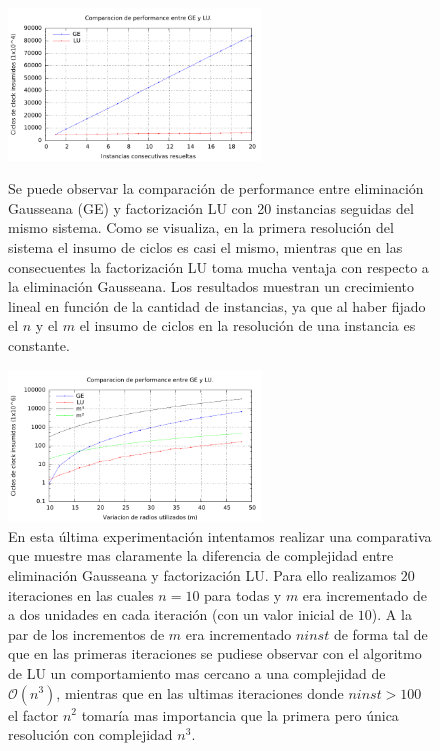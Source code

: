 \clearpage

\begin{figure}
  \caption{ Se puede observar la comparaci\'on de performance entre eliminaci\'on Gausseana (GE) y factorizaci\'on LU con 20 instancias seguidas del mismo sistema. Como se visualiza, en la primera resoluci\'on del sistema el insumo de ciclos es casi el mismo, mientras que en las consecuentes la factorizaci\'on LU toma mucha ventaja con respecto a la eliminaci\'on Gausseana. Los resultados muestran un crecimiento lineal en funci\'on de la cantidad de instancias, ya que al haber fijado  el $n$ y el $m$ el insumo de ciclos en la resoluci\'on de una instancia es constante.\newline}
  \includegraphics[width=0.6\textwidth]{../src/experimentacion/PDFs/compbench.pdf}
  \label{compbench-glu}
\end{figure}

\begin{figure}
\caption{ En esta última experimentaci\'on intentamos realizar una comparativa que muestre mas claramente la diferencia de complejidad entre eliminaci\'on Gausseana y factorizaci\'on LU. Para ello realizamos $20$ iteraciones en las cuales $n=10$ para todas y $m$ era incrementado de a dos unidades en cada iteraci\'on (con un valor inicial de $10$). A la par de los incrementos de $m$ era incrementado $ninst$ de forma tal de que en las primeras iteraciones se pudiese observar con el algoritmo de LU un comportamiento mas cercano a una complejidad de $\mathcal{O}(n^3)$, mientras que en las ultimas iteraciones donde $ninst > 100$ el factor $n^2$ tomar\'ia mas importancia que la primera pero \'unica resoluci\'on con complejidad $n^3$.}
    \label{compbench-extra}
  \includegraphics[width=0.6\textwidth]{../src/experimentacion/PDFs/compbench-extra.pdf}
\end{figure}

